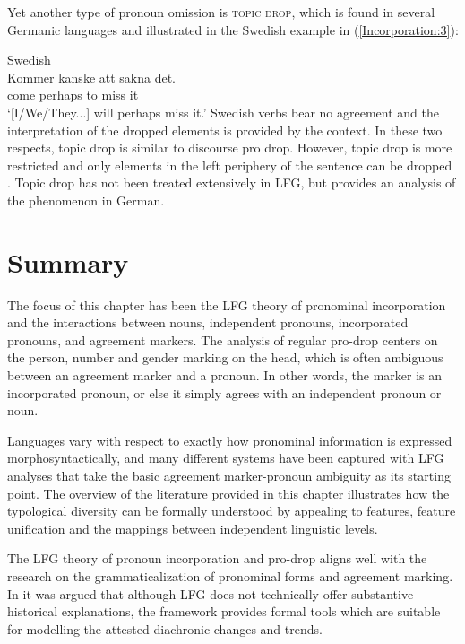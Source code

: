 \documentclass[output=paper,hidelinks]{langscibook}
\begin{document}
   Yet  another type of pronoun  omission is \textsc{topic  drop}, which  is  found in several Germanic languages  and   illustrated in the  Swedish example in  (\ref{Incorporation:3}): 

   \ea \label{Incorporation:3}Swedish\\
   \gll Kommer kanske att sakna det.  \\
     come perhaps to miss it  \\
   \glt `[I/We/They...] will perhaps miss it.' 
\z
Swedish verbs bear  no  agreement  and the  interpretation of  the  dropped elements  is  provided by the context.    In these  two respects, topic  drop  is  similar to discourse pro  drop.  However,  topic  drop  is  more restricted and  only elements in the left  periphery of the sentence can  be dropped \citep{NeelemanSzendroi07, SigurdssonMaling08, sigurdsson2011}.  Topic drop has not been treated extensively in LFG, but \citet{berman96} provides an    analysis  of the phenomenon  in German. 

 

\section{Summary}

 The focus of this chapter has  been the LFG theory of pronominal incorporation and the interactions between nouns, independent pronouns, incorporated pronouns, and agreement markers.  The analysis of regular pro-drop centers on the person, number and gender marking on the head, which is  often ambiguous between  an agreement marker and a pronoun.  In other words, the marker is an incorporated pronoun, or else it simply agrees with an independent pronoun or noun.  
 
 Languages  vary with respect to  exactly how pronominal information is expressed morphosyntactically, and many different systems have been captured with LFG analyses that take the basic agreement marker-pronoun ambiguity as its starting point.   The overview of  the literature provided in this chapter illustrates how the typological  diversity  can be formally understood by appealing to  features, feature unification  and  the mappings between independent linguistic levels.  
 
 The LFG theory of pronoun incorporation and pro-drop aligns well with  the research on the grammaticalization of pronominal forms and agreement marking. In  it was argued that although   LFG   does not technically    offer  substantive historical explanations,  the framework provides formal tools which are  suitable for modelling the attested diachronic changes and  trends. 
 
\end{document}

